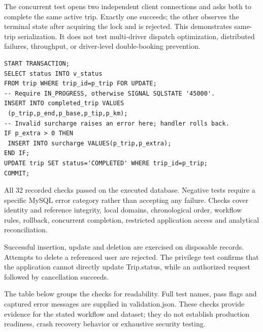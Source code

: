 \documentclass[11pt,a4paper]{article}
\begin{document}
The concurrent test opens two independent client connections and asks both to complete the same active trip. Exactly one succeeds; the other observes the terminal state after acquiring the lock and is rejected. This demonstrates same-trip serialization. It does not test multi-driver dispatch optimization, distributed failures, throughput, or driver-level double-booking prevention.

\begin{lstlisting}
START TRANSACTION;
SELECT status INTO v_status
FROM trip WHERE trip_id=p_trip FOR UPDATE;
-- Require IN_PROGRESS, otherwise SIGNAL SQLSTATE '45000'.
INSERT INTO completed_trip VALUES
 (p_trip,p_end,p_base,p_tip,p_km);
-- Invalid surcharge raises an error here; handler rolls back.
IF p_extra > 0 THEN
 INSERT INTO surcharge VALUES(p_trip,p_extra);
END IF;
UPDATE trip SET status='COMPLETED' WHERE trip_id=p_trip;
COMMIT;
\end{lstlisting}

All 32 recorded checks passed on the executed database. Negative tests require a specific MySQL error category rather than accepting any failure. Checks cover identity and reference integrity, local domains, chronological order, workflow rules, rollback, concurrent completion, restricted application access and analytical reconciliation.

Successful insertion, update and deletion are exercised on disposable records. Attempts to delete a referenced user are rejected. The privilege test confirms that the application cannot directly update Trip.status, while an authorized request followed by cancellation succeeds.

The table below groups the checks for readability. Full test names, pass flags and captured error messages are supplied in validation.json. These checks provide evidence for the stated workflow and dataset; they do not establish production readiness, crash recovery behavior or exhaustive security testing.
\end{document}

